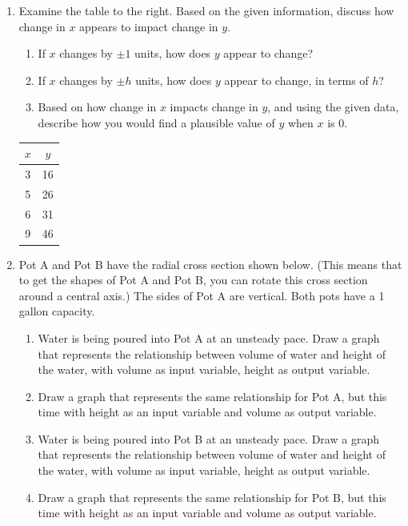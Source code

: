 \documentclass[11pt]{article}
\theoremstyle{definition}
\begin{document}
\begin{enumerate}[resume]
\item \label{h: covariation intro morgan}
Examine the table to the right. Based on the given information, discuss how change in $x$ appears to impact change in $y$. 

\begin{minipage}{5in}\raggedright
	\begin{enumerate}
	\item If $x$ changes by $\pm 1$ units, how does $y$ appear to change?
	\item If $x$ changes by $\pm h$ units, how does $y$ appear to change, in terms of $h$?
	\item Based on how change in $x$ impacts change in $y$, and using the given data, describe how you would find a plausible value of $y$ when $x$ is $0$. 
	\end{enumerate}
\end{minipage}
\begin{minipage}{1in}
\vspace*{-12pt}
\begin{center}
\begin{tabular}{c|c}
$x$ & $y$ \\ \hline
3 & 16 \\
5 & 26 \\
6 & 31 \\
9 & 46 \\
\end{tabular}
\end{center}
\end{minipage}

\item \label{h: covariation linear relationship nonlinear variables}
Pot A and Pot B have the radial cross section shown below. (This means that to get the shapes of Pot A and Pot B, you can rotate this cross section around a central axis.) The sides of Pot A are vertical. Both pots have a 1 gallon capacity.

\begin{enumerate}
\item Water is being poured into Pot A at an unsteady pace. Draw a graph that represents the relationship between volume of water and height of the water, with volume as input variable, height as output variable.
\item Draw a graph that represents the same relationship for Pot A, but this time with height as an input variable and volume as output variable.
\item Water is being poured into Pot B at an unsteady pace. Draw a graph that represents the relationship between volume of water and height of the water, with volume as input variable, height as output variable.
\item Draw a graph that represents the same relationship for Pot B, but this time with height as an input variable and volume as output variable.
\end{enumerate}
\end{enumerate}
\end{document}
